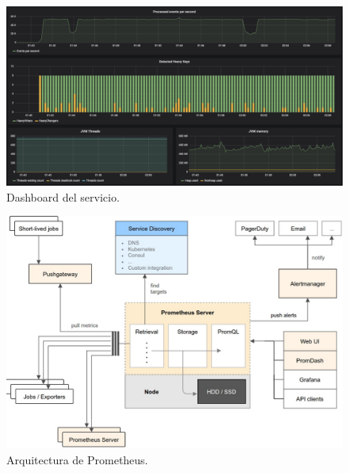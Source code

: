 \documentclass[a4paper,10pt, oneside]{article}
\begin{document}
\begin{figure}[h]
	\centering
	\includegraphics[width=1.5\textwidth,angle=90]{./graph/service_dashboard.png}
	\caption{Dashboard del servicio.}
	\label{diag:service_dashboard}
\end{figure}

\begin{figure}[h]
	\centering
	\includegraphics[width=1.2\textwidth,angle=90]{./graph/prometheus.jpeg}
	\caption{Arquitectura de Prometheus.}
	\label{diag:prometheus}
\end{figure}

\clearpage

\listoffigures

\clearpage

\nocite{*}
\printbibliography
\end{document}
